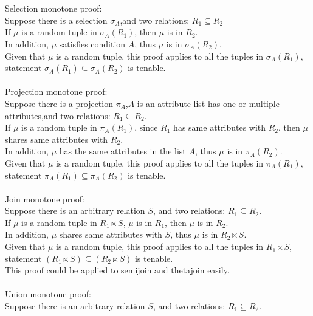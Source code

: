 \documentclass{article}
\begin{document}
\section{}
Selection monotone proof:\\
Suppose there is a selection $\sigma_{A}$,and two relations: $R_{1}\subseteq R_{2}$\\
If $\mu$ is a random tuple in $\sigma_{A}(R_{1})$, then $\mu$ is in $R_{2}$.\\
In addition, $\mu$ satisfies condition $A$, thus $\mu$ is in $\sigma_{A}(R_{2})$.\\
Given that $\mu$ is a random tuple, this proof applies to all the tuples in $\sigma_{A}(R_{1})$, statement $\sigma_{A}(R_{1})\subseteq \sigma_{A}(R_{2})$ is tenable.\\
\\
Projection monotone proof:\\
Suppose there is a projection $\pi_{A}$,$A$ is an attribute list has one or multiple attributes,and two relations: $R_{1}\subseteq R_{2}$.\\
If $\mu$ is a random tuple in $\pi_{A}(R_{1})$, since $R_{1}$ has same attributes with $R_{2}$, then $\mu$ shares same attributes with $R_{2}$.\\
In addition, $\mu$ has the same attributes in the list $A$, thus $\mu$ is in $\pi_{A}(R_{2})$.\\
Given that $\mu$ is a random tuple, this proof applies to all the tuples in $\pi_{A}(R_{1})$, statement $\pi_{A}(R_{1})\subseteq \pi_{A}(R_{2})$ is tenable.\\
\\
Join monotone proof:\\
Suppose there is an arbitrary relation $S$, and two relations: $R_{1}\subseteq R_{2}$.\\
If $\mu$ is a random tuple in $R_{1}\ltimes S$, $\mu$ is in $R_{1}$, then $\mu$ is in $R_{2}$.\\
In addition, $\mu$ shares same attributes with $S$, thus $\mu$ is in $R_{2}\ltimes S$.\\
Given that $\mu$ is a random tuple, this proof applies to all the tuples in $R_{1}\ltimes S$, statement $(R_{1}\ltimes S) \subseteq (R_{2}\ltimes S)$ is tenable.\\
This proof could be applied to semijoin and thetajoin easily.\\
\\
Union monotone proof:\\
Suppose there is an arbitrary relation $S$, and two relations: $R_{1}\subseteq R_{2}$.\\
\end{document}
